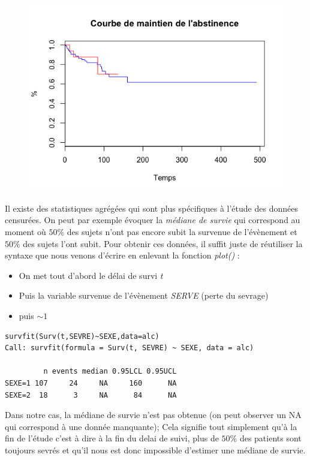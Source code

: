 \begin{figure}[H]\begin{center}\includegraphics[scale=0.5]{ilu/dsurv4.png}\end{center}\end{figure}

Il existe des statistiques agrégées qui sont plus spécifiques à l'étude des données censurées. On peut par exemple évoquer la \textit{médiane de survie} qui correspond au moment où $50\%$ des sujets n'ont pas encore subit la survenue de l'évènement et $50\%$ des sujets l'ont subit.\newline
Pour obtenir ces données, il suffit juste de réutiliser la syntaxe que nous venons d'écrire en enlevant la fonction \textit{plot()} : 
\begin{itemize}
\item On met tout d'abord le délai de survi \textit{t}
\item Puis la variable survenue de l'évènement \textit{SERVE} (perte du sevrage)
\item puis $\sim 1$
\end{itemize}

\begin{lstlisting}[language=html]
survfit(Surv(t,SEVRE)~SEXE,data=alc)
Call: survfit(formula = Surv(t, SEVRE) ~ SEXE, data = alc)

         n events median 0.95LCL 0.95UCL
SEXE=1 107     24     NA     160      NA
SEXE=2  18      3     NA      84      NA
\end{lstlisting}
Dans notre cas, la médiane de survie n'est pas obtenue (on peut observer un NA qui correspond à une donnée manquante); Cela signifie tout simplement qu'à la fin de l'étude c'est à dire à la fin du delai de suivi, plus de $50\%$ des patients sont toujours sevrés et qu'il nous est donc impossible d'estimer une médiane de survie.

